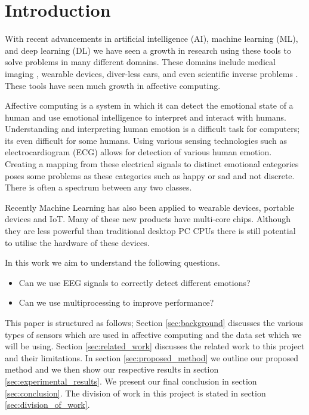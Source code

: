 \section{Introduction}
With recent advancements in
artificial intelligence (AI),
machine learning (ML),
and deep learning (DL)
we have seen a growth in
research using these tools to
solve problems in many different domains.
These domains include medical imaging \cite{Greenspan:2016},
wearable devices,
diver-less cars,
and even scientific inverse problems \cite{laanait2019exascale}.
These tools have seen much growth in affective computing.

Affective computing is a system in which it can detect the
emotional state of a human and use emotional intelligence
to interpret and interact with humans.
Understanding and interpreting human emotion is a
difficult task for computers;
its even difficult for some humans.
Using various sensing technologies such as electrocardiogram (ECG)
allows for detection of various human emotion.
Creating a mapping from these electrical signals to
distinct emotional categories poses some problems as
these categories such as happy or sad and not discrete.
There is often a spectrum between any two classes.

Recently Machine Learning has also been applied to wearable devices,
portable devices and IoT.
Many of these new products have multi-core chips.
Although they are less powerful than traditional desktop PC
CPUs there is still potential to utilise the hardware of these devices.

In this work we aim to understand the following questions.
\begin{itemize}
    \item Can we use EEG signals to correctly detect different emotions?
    \item Can we use multiprocessing to improve performance?
\end{itemize}

This paper is structured as follows;
Section \ref{sec:background} discusses the various types of sensors
which are used in affective computing and the data set which we will be using.
%
Section \ref{sec:related_work} discusses the related work to this project
and their limitations.
%
In section \ref{sec:proposed_method} we outline our proposed method
and we then show our respective results in section \ref{sec:experimental_results}.
%
We present our final conclusion in section \ref{sec:conclusion}.
%
The division of work in this project is stated in section
\ref{sec:division_of_work}.
